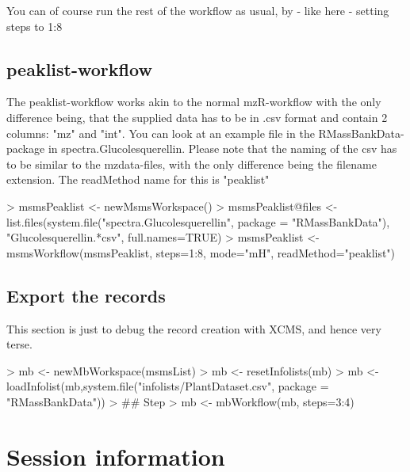 \documentclass[letterpaper, 11pt]{article}
\begin{document}
You can of course run the rest of the workflow as usual, by - like here - setting steps to 1:8

\subsection{peaklist-workflow}

The peaklist-workflow works akin to the normal mzR-workflow with the only difference being, that the supplied data has to be in .csv format and contain 2 columns: "mz" and "int".
You can look at an example file in the RMassBankData-package in spectra.Glucolesquerellin. Please note that the naming of the csv has to be similar to the mzdata-files, with the only difference being the filename extension.
The readMethod name for this is "peaklist"

\begin{Schunk}
\begin{Sinput}
> 	msmsPeaklist <- newMsmsWorkspace()
> 	msmsPeaklist@files <- list.files(system.file("spectra.Glucolesquerellin", package = "RMassBankData"), "Glucolesquerellin.*csv", full.names=TRUE)
> 	msmsPeaklist <- msmsWorkflow(msmsPeaklist, steps=1:8, mode="mH", readMethod="peaklist")
\end{Sinput}
\end{Schunk}

\subsection{Export the records}

This section is just to debug the record creation with XCMS, and hence very terse.


\begin{Schunk}
\begin{Sinput}
> mb <- newMbWorkspace(msmsList)
> mb <- resetInfolists(mb)
> mb <- loadInfolist(mb,system.file("infolists/PlantDataset.csv", package = "RMassBankData"))
> ## Step 
> mb <- mbWorkflow(mb, steps=3:4)
\end{Sinput}
\end{Schunk}




\section{Session information}
\end{document}
